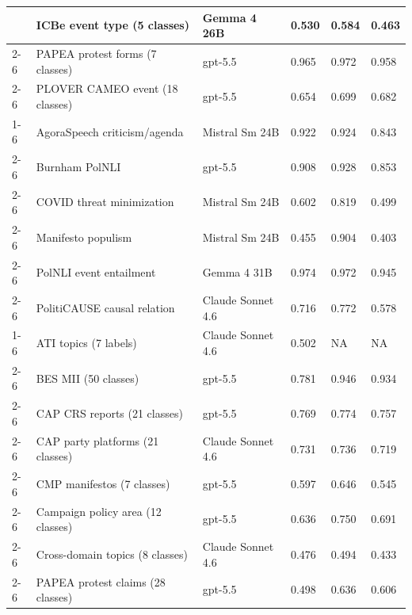 \begin{table}[H]
\begin{tabular}[t]{llllll}
 & ICBe event type (5 classes) & Gemma 4 26B & 0.530 & 0.584 & 0.463\\
\cmidrule{2-6}
 & PAPEA protest forms (7 classes) & gpt-5.5 & 0.965 & 0.972 & 0.958\\
\cmidrule{2-6}
\multirow[t]{-5}{*}{\raggedright\arraybackslash Events \& Actions} & PLOVER CAMEO event (18 classes) & gpt-5.5 & 0.654 & 0.699 & 0.682\\
\cmidrule{1-6}
 & AgoraSpeech criticism/agenda & Mistral Sm 24B & 0.922 & 0.924 & 0.843\\
\cmidrule{2-6}
 & Burnham PolNLI & gpt-5.5 & 0.908 & 0.928 & 0.853\\
\cmidrule{2-6}
 & COVID threat minimization & Mistral Sm 24B & 0.602 & 0.819 & 0.499\\
\cmidrule{2-6}
 & Manifesto populism & Mistral Sm 24B & 0.455 & 0.904 & 0.403\\
\cmidrule{2-6}
 & PolNLI event entailment & Gemma 4 31B & 0.974 & 0.972 & 0.945\\
\cmidrule{2-6}
\multirow[t]{-6}{*}{\raggedright\arraybackslash Claims \& Relations} & PolitiCAUSE causal relation & Claude Sonnet 4.6 & 0.716 & 0.772 & 0.578\\
\cmidrule{1-6}
 & ATI topics (7 labels) & Claude Sonnet 4.6 & 0.502 & NA & NA\\
\cmidrule{2-6}
 & BES MII (50 classes) & gpt-5.5 & 0.781 & 0.946 & 0.934\\
\cmidrule{2-6}
 & CAP CRS reports (21 classes) & gpt-5.5 & 0.769 & 0.774 & 0.757\\
\cmidrule{2-6}
 & CAP party platforms (21 classes) & Claude Sonnet 4.6 & 0.731 & 0.736 & 0.719\\
\cmidrule{2-6}
 & CMP manifestos (7 classes) & gpt-5.5 & 0.597 & 0.646 & 0.545\\
\cmidrule{2-6}
 & Campaign policy area (12 classes) & gpt-5.5 & 0.636 & 0.750 & 0.691\\
\cmidrule{2-6}
 & Cross-domain topics (8 classes) & Claude Sonnet 4.6 & 0.476 & 0.494 & 0.433\\
\cmidrule{2-6}
\multirow[t]{-8}{*}{\raggedright\arraybackslash Issues \& Topics} & PAPEA protest claims (28 classes) & gpt-5.5 & 0.498 & 0.636 & 0.606\\
\bottomrule
\end{tabular}
\end{table}
